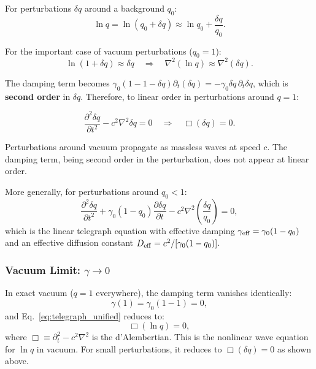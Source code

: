 \documentclass[aps,prd,twocolumn,showpacs,superscriptaddress,preprintnumbers]{revtex4-2}
\begin{document}
For perturbations $\delta q$ around a background $q_0$:
\begin{equation}
\ln q = \ln(q_0 + \delta q) \approx \ln q_0 + \frac{\delta q}{q_0}.
\end{equation}

For the important case of vacuum perturbations ($q_0=1$):
\begin{equation}
\ln(1+\delta q) \approx \delta q \quad\Longrightarrow\quad \nabla^2(\ln q) \approx \nabla^2(\delta q).
\end{equation}

The damping term becomes $\gamma_0(1-1-\delta q)\partial_t(\delta q) = -\gamma_0\delta q\,\partial_t\delta q$, which is \textbf{second order} in $\delta q$.
Therefore, to linear order in perturbations around $q=1$:

\begin{equation}
\boxed{\frac{\partial^2 \delta q}{\partial t^2} - c^2\nabla^2\delta q = 0 \quad\Longrightarrow\quad \Box(\delta q) = 0}.
\label{eq:kg_vacuum}
\end{equation}

Perturbations around vacuum propagate as massless waves at speed $c$.
The damping term, being second order in the perturbation, does not appear at linear order.

More generally, for perturbations around $q_0<1$:
\begin{equation}
\frac{\partial^2 \delta q}{\partial t^2} + \gamma_0(1-q_0)\frac{\partial \delta q}{\partial t} - c^2\nabla^2\left(\frac{\delta q}{q_0}\right) = 0,
\label{eq:linear_telegraph_general}
\end{equation}
which is the linear telegraph equation with effective damping $\gamma_{\rm eff}=\gamma_0(1-q_0)$ and an effective diffusion constant $D_{\rm eff}=c^2/[\gamma_0(1-q_0)]$.

\subsubsection{Vacuum Limit: $\gamma\to0$}

In exact vacuum ($q=1$ everywhere), the damping term vanishes identically:
\begin{equation}
\gamma(1) = \gamma_0(1-1) = 0,
\end{equation}
and Eq.~\eqref{eq:telegraph_unified} reduces to:
\begin{equation}
\boxed{\Box(\ln q) = 0},
\label{eq:box_lnq}
\end{equation}
where $\Box\equiv\partial_t^2-c^2\nabla^2$ is the d'Alembertian.
This is the nonlinear wave equation for $\ln q$ in vacuum.
For small perturbations, it reduces to $\Box(\delta q)=0$ as shown above.
\end{document}
